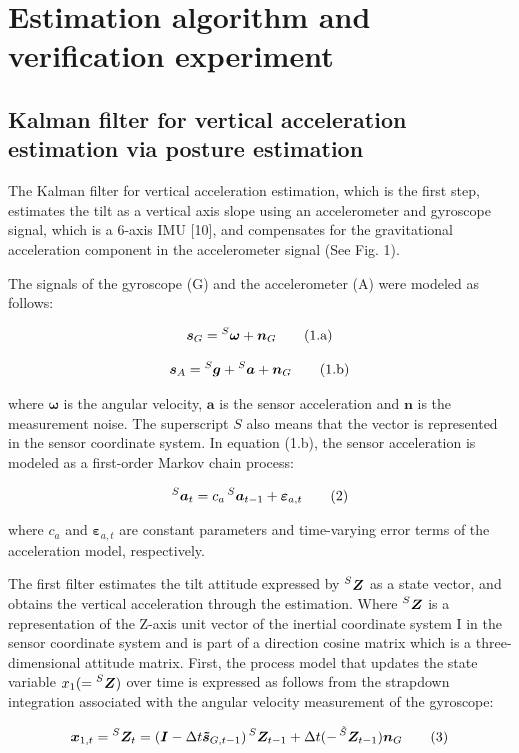 \documentclass[10pt,journal,compsoc]{IEEEtran}
\begin{document}
\section{Estimation algorithm and verification experiment}

\subsection{Kalman filter for vertical acceleration estimation via posture estimation}

The Kalman filter for vertical acceleration estimation, which is the first
step, estimates the tilt as a vertical axis slope using an accelerometer and
gyroscope signal, which is a 6-axis IMU [10], and compensates for the
gravitational acceleration component in the accelerometer signal (See Fig. 1).

The signals of the gyroscope (G) and the accelerometer (A) were modeled as
follows:

\[\bm{s}_G = \prescript{S}{}{\bm{\omega}}+\bm{n}_G\tag{1.a}\]

\[\bm{s}_A = \prescript{S}{}{\bm{g}}+\prescript{S}{}{\bm{a}}+\bm{n}_G\tag{1.b}\]


\noindent where $\bm{\omega}$ is the angular velocity, $\bm{a}$ is the sensor
acceleration and $\bm{n}$ is the measurement noise. The superscript $S$ also
means that the vector is represented in the sensor coordinate system. In
equation (1.b), the sensor acceleration is modeled as a first-order Markov
chain process:

\[\prescript{S}{}{\bm{a}_t} = c_a\prescript{S}{}{\bm{a}_{t-1}}+\bm{\varepsilon}_{a,t}\tag{2}\]

\noindent where $c_a$ and $\bm{\varepsilon}_{a,t}$ are constant parameters and time-varying error terms of
the acceleration model, respectively.

The first filter estimates the tilt attitude expressed by
$\prescript{S}{}{\bm{Z}}$ as a state vector, and obtains the vertical
acceleration through the estimation. Where $\prescript{S}{}{\bm{Z}}$ is a
representation of the Z-axis unit vector of the inertial coordinate system I in
the sensor coordinate system and is part of a direction cosine matrix which is
a three-dimensional attitude matrix. First, the process model that updates the
state variable $x_1 (= \prescript{S}{}{\bm{Z}})$ over time is expressed as
follows from the strapdown integration associated with the angular velocity
measurement of the gyroscope:

\[\bm{x}_{1,t}=\prescript{S}{}{\bm{Z}_t}=
(\bm{I}-\Delta t\bm{\tilde{s}}_{G,t-1})\prescript{S}{}{\bm{Z}_{t-1}}+\Delta t(-\prescript{\tilde{S}}{}{\bm{Z}_{t-1}})\bm{n}_G\tag{3}\]
\end{document}
